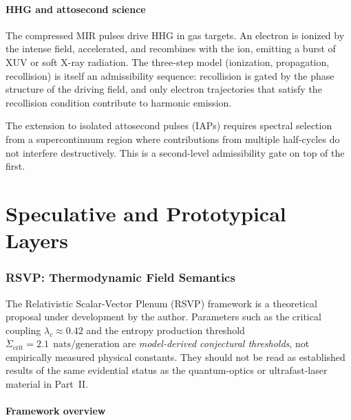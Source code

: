 \documentclass[12pt, a4paper]{article}
\theoremstyle{plain}
\theoremstyle{definition}
\theoremstyle{remark}
\newcommand{\nats}{\;\text{nats}}
\begin{document}
\subsection{HHG and attosecond science}

The compressed MIR pulses drive HHG in gas targets.
An electron is ionized by the intense field, accelerated, and
recombines with the ion, emitting a burst of XUV or soft X-ray radiation.
The three-step model (ionization, propagation, recollision) is itself
an admissibility sequence: recollision is gated by the phase structure
of the driving field, and only electron trajectories that satisfy the
recollision condition contribute to harmonic emission.

The extension to isolated attosecond pulses (IAPs) requires spectral
selection from a supercontinuum region where contributions from multiple
half-cycles do not interfere destructively.
This is a second-level admissibility gate on top of the first.

\part{Speculative and Prototypical Layers}

\section{RSVP: Thermodynamic Field Semantics}
\label{sec:rsvp}

\begin{speculative}
  The Relativistic Scalar-Vector Plenum (RSVP) framework is a
  theoretical proposal under development by the author.
  Parameters such as the critical coupling $\lambda_c \approx 0.42$
  and the entropy production threshold $\dot{\Sigma}_{\mathrm{crit}}
  = 2.1\,\nats/\text{generation}$ are \emph{model-derived conjectural
  thresholds}, not empirically measured physical constants.
  They should not be read as established results of the same
  evidential status as the quantum-optics or ultrafast-laser material
  in Part~II.
\end{speculative}

\subsection{Framework overview}
\end{document}
